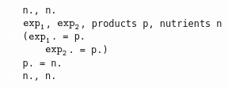 \begin{figure}[H]
    \texttt{
    \textcolor{white}{F} n., n. \\
    \textcolor{white}{FF} $\texttt{exp}\sb\texttt{1}$, $\texttt{exp}\sb\texttt{2}$, products p, nutrients n\\
    \textcolor{white}{FF} ($\texttt{exp}\sb\texttt{1}$. = p.\\
    \textcolor{white}{FFFFFF} $\texttt{exp}\sb\texttt{2}$. = p.) \\
    \textcolor{white}{FF} p. = n.\\
    \textcolor{white}{FF} n., n.  
    }
\end{figure}

